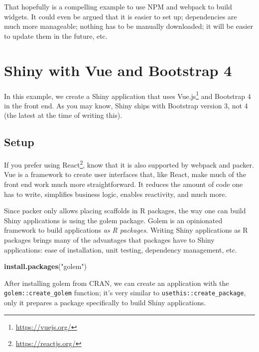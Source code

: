\documentclass[10pt,]{krantz}
\makeatletter
\newenvironment{Shaded}{\begin{snugshade}}{\end{snugshade}}
\newcommand{\KeywordTok}[1]{\textcolor[rgb]{0.27,0.27,0.27}{\textbf{#1}}}
\newcommand{\NormalTok}[1]{#1}
\newcommand{\StringTok}[1]{\textcolor[rgb]{0.5,0.5,0.5}{#1}}
\renewcommand{\href}[2]{#2\footnote{\url{#1}}}
\newenvironment{kframe}{%
\medskip{}
\setlength{\fboxsep}{.8em}
 \def\at@end@of@kframe{}%
 \ifinner\ifhmode%
  \def\at@end@of@kframe{\end{minipage}}%
  \begin{minipage}{\columnwidth}%
 \fi\fi%
 \def\FrameCommand##1{\hskip\@totalleftmargin \hskip-\fboxsep
 \colorbox{shadecolor}{##1}\hskip-\fboxsep
     \hskip-\linewidth \hskip-\@totalleftmargin \hskip\columnwidth}%
 \MakeFramed {\advance\hsize-\width
   \@totalleftmargin\z@ \linewidth\hsize
   \@setminipage}}%
 {\par\unskip\endMakeFramed%
 \at@end@of@kframe}
\renewenvironment{Shaded}{\begin{kframe}}{\end{kframe}}
\makeatother
\begin{document}
That hopefully is a compelling example to use NPM and webpack to build widgets. It could even be argued that it is easier to set up; dependencies are much more manageable; nothing has to be manually downloaded; it will be easier to update them in the future, etc.

\hypertarget{packer-adv-shiny-vue}{%
\section{Shiny with Vue and Bootstrap 4}\label{packer-adv-shiny-vue}}

In this example, we create a Shiny application that uses \href{https://vuejs.org/}{Vue.js} and Bootstrap 4 in the front end. As you may know, Shiny ships with Bootstrap version 3, not 4 (the latest at the time of writing this).

\hypertarget{packer-adv-shiny-vue-setup}{%
\subsection{Setup}\label{packer-adv-shiny-vue-setup}}

If you prefer using \href{https://reactjs.org/}{React}, know that it is also supported by webpack and packer. Vue is a framework to create user interfaces that, like React, make much of the front end work much more straightforward. It reduces the amount of code one has to write, simplifies business logic, enables reactivity, and much more.

Since packer only allows placing scaffolds in R packages, the way one can build Shiny applications is using the golem package. Golem is an opinionated framework to build applications \emph{as R packages.} Writing Shiny applications as R packages brings many of the advantages that packages have to Shiny applications: ease of installation, unit testing, dependency management, etc.

\begin{Shaded}
\begin{Highlighting}[]
\KeywordTok{install.packages}\NormalTok{(}\StringTok{"golem"}\NormalTok{)}
\end{Highlighting}
\end{Shaded}

After installing golem from CRAN, we can create an application with the \texttt{golem::create\_golem} function; it's very similar to \texttt{usethis::create\_package}, only it prepares a package specifically to build Shiny applications.
\end{document}
